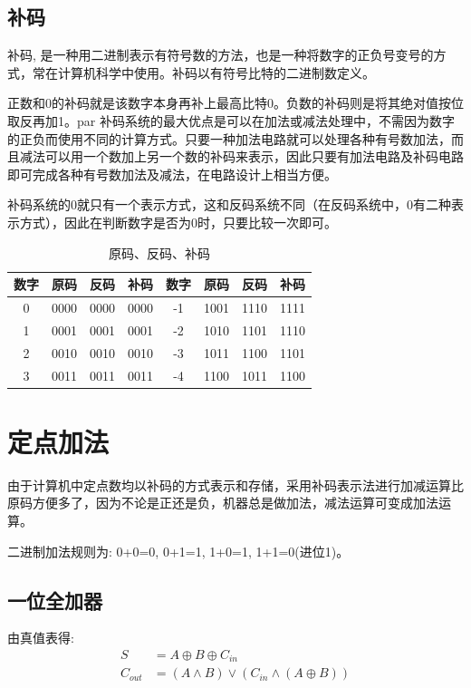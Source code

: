 \documentclass[AutoFakeBold]{LZUThesis}
\begin{document}
    \subsection{补码}
    补码, 是一种用二进制表示有符号数的方法，也是一种将数字的正负号变号的方式，常在计算机科学中使用。补码以有符号比特的二进制数定义。\par
    正数和0的补码就是该数字本身再补上最高比特0。负数的补码则是将其绝对值按位取反再加1。par
    补码系统的最大优点是可以在加法或减法处理中，不需因为数字的正负而使用不同的计算方式。只要一种加法电路就可以处理各种有号数加法，而且减法可以用一个数加上另一个数的补码来表示，因此只要有加法电路及补码电路即可完成各种有号数加法及减法，在电路设计上相当方便。\par
    补码系统的0就只有一个表示方式，这和反码系统不同（在反码系统中，0有二种表示方式），因此在判断数字是否为0时，只要比较一次即可。\par
    \begin{table}[htbp]
        \centering
        \caption{原码、反码、补码}
        \begin{tabular}{cccc|cccc}
            \hline
            数字 & 原码 & 反码 & 补码 & 数字 & 原码 & 反码 & 补码 \\
            \hline
            0 & 0000 & 0000 & 0000 & -1 & 1001 & 1110 & 1111 \\
            \hline
            1 & 0001 & 0001 & 0001 & -2 & 1010 & 1101 & 1110 \\
            \hline
            2 & 0010 & 0010 & 0010 & -3 & 1011 & 1100 & 1101 \\
            \hline
            3 & 0011 & 0011 & 0011 & -4 & 1100 & 1011 & 1100 \\
            \hline
        \end{tabular}
    \end{table}

\section{定点加法}
由于计算机中定点数均以补码的方式表示和存储，采用补码表示法进行加减运算比原码方便多了，因为不论是正还是负，机器总是做加法，减法运算可变成加法运算。\par
二进制加法规则为: 0+0=0, 0+1=1, 1+0=1, 1+1=0(进位1)。\par
\subsection{一位全加器}
由真值表得:
\begin{equation}
    \begin{aligned}
        S & = A \oplus B \oplus C_{in} \\
        C_{out} & = (A \land B) \lor (C_{in} \land (A \oplus B))
    \end{aligned}
\end{equation}
\end{document}

